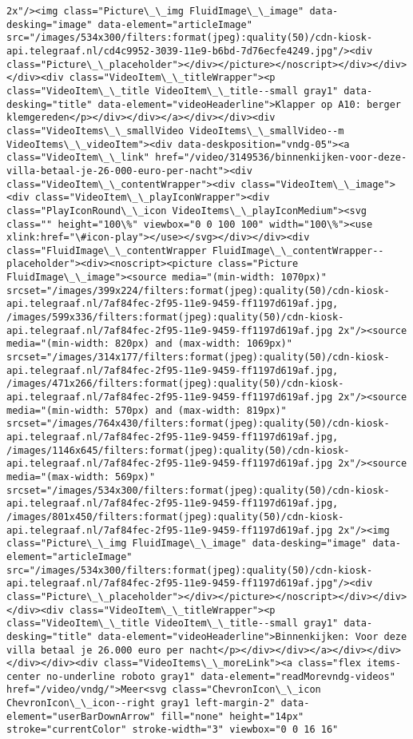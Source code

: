 \documentclass[11pt]{article}
\begin{document}
\begin{Verbatim}[commandchars=\\\{\}]
2x"/><img class="Picture\_\_img FluidImage\_\_image" data-desking="image" data-element="articleImage" src="/images/534x300/filters:format(jpeg):quality(50)/cdn-kiosk-api.telegraaf.nl/cd4c9952-3039-11e9-b6bd-7d76ecfe4249.jpg"/><div class="Picture\_\_placeholder"></div></picture></noscript></div></div></div><div class="VideoItem\_\_titleWrapper"><p class="VideoItem\_\_title VideoItem\_\_title--small gray1" data-desking="title" data-element="videoHeaderline">Klapper op A10: berger klemgereden</p></div></div></a></div></div><div class="VideoItems\_\_smallVideo VideoItems\_\_smallVideo--m VideoItems\_\_videoItem"><div data-deskposition="vndg-05"><a class="VideoItem\_\_link" href="/video/3149536/binnenkijken-voor-deze-villa-betaal-je-26-000-euro-per-nacht"><div class="VideoItem\_\_contentWrapper"><div class="VideoItem\_\_image"><div class="VideoItem\_\_playIconWrapper"><div class="PlayIconRound\_\_icon VideoItems\_\_playIconMedium"><svg class="" height="100\%" viewbox="0 0 100 100" width="100\%"><use xlink:href="\#icon-play"></use></svg></div></div><div class="FluidImage\_\_contentWrapper FluidImage\_\_contentWrapper--placeholder"><div><noscript><picture class="Picture FluidImage\_\_image"><source media="(min-width: 1070px)" srcset="/images/399x224/filters:format(jpeg):quality(50)/cdn-kiosk-api.telegraaf.nl/7af84fec-2f95-11e9-9459-ff1197d619af.jpg, /images/599x336/filters:format(jpeg):quality(50)/cdn-kiosk-api.telegraaf.nl/7af84fec-2f95-11e9-9459-ff1197d619af.jpg 2x"/><source media="(min-width: 820px) and (max-width: 1069px)" srcset="/images/314x177/filters:format(jpeg):quality(50)/cdn-kiosk-api.telegraaf.nl/7af84fec-2f95-11e9-9459-ff1197d619af.jpg, /images/471x266/filters:format(jpeg):quality(50)/cdn-kiosk-api.telegraaf.nl/7af84fec-2f95-11e9-9459-ff1197d619af.jpg 2x"/><source media="(min-width: 570px) and (max-width: 819px)" srcset="/images/764x430/filters:format(jpeg):quality(50)/cdn-kiosk-api.telegraaf.nl/7af84fec-2f95-11e9-9459-ff1197d619af.jpg, /images/1146x645/filters:format(jpeg):quality(50)/cdn-kiosk-api.telegraaf.nl/7af84fec-2f95-11e9-9459-ff1197d619af.jpg 2x"/><source media="(max-width: 569px)" srcset="/images/534x300/filters:format(jpeg):quality(50)/cdn-kiosk-api.telegraaf.nl/7af84fec-2f95-11e9-9459-ff1197d619af.jpg, /images/801x450/filters:format(jpeg):quality(50)/cdn-kiosk-api.telegraaf.nl/7af84fec-2f95-11e9-9459-ff1197d619af.jpg 2x"/><img class="Picture\_\_img FluidImage\_\_image" data-desking="image" data-element="articleImage" src="/images/534x300/filters:format(jpeg):quality(50)/cdn-kiosk-api.telegraaf.nl/7af84fec-2f95-11e9-9459-ff1197d619af.jpg"/><div class="Picture\_\_placeholder"></div></picture></noscript></div></div></div><div class="VideoItem\_\_titleWrapper"><p class="VideoItem\_\_title VideoItem\_\_title--small gray1" data-desking="title" data-element="videoHeaderline">Binnenkijken: Voor deze villa betaal je 26.000 euro per nacht</p></div></div></a></div></div></div></div><div class="VideoItems\_\_moreLink"><a class="flex items-center no-underline roboto gray1" data-element="readMorevndg-videos" href="/video/vndg/">Meer<svg class="ChevronIcon\_\_icon ChevronIcon\_\_icon--right gray1 left-margin-2" data-element="userBarDownArrow" fill="none" height="14px" stroke="currentColor" stroke-width="3" viewbox="0 0 16 16" 
\end{Verbatim}
\end{document}
